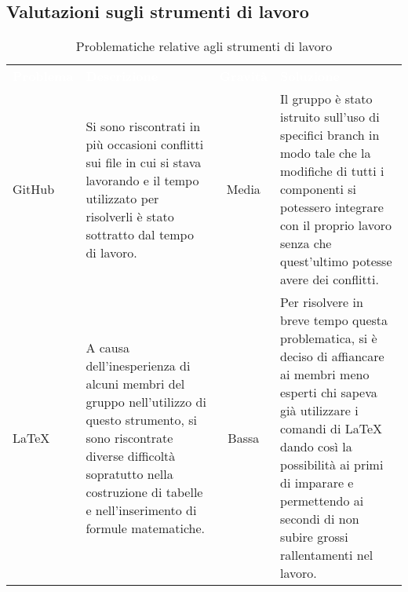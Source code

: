 \subsection{Valutazioni sugli strumenti di lavoro}

\begin{table}[H]
\caption{Problematiche relative agli strumenti di lavoro}
\begin{tabular}{ C{2.5cm} L{5cm} c L{5.5cm} }
\textcolor{white}{\textbf{Problema}} & \centerline{\textcolor{white}{\textbf{Descrizione}}} & \textcolor{white}{\textbf{Gravità}} & \centerline{\textcolor{white}{\textbf{Soluzione}}}\\
GitHub & Si sono riscontrati in più occasioni
conflitti sui file in cui si stava lavorando e il tempo utilizzato per risolverli è stato sottratto dal tempo di lavoro. & Media & Il gruppo è stato istruito sull’uso di specifici branch in modo tale che la modifiche di tutti i componenti si potessero integrare con il proprio lavoro senza che quest’ultimo potesse avere dei conflitti. \\
\LaTeX{} & A causa dell’inesperienza di
alcuni membri del gruppo nell’utilizzo
di questo strumento, si sono riscontrate diverse
difficoltà sopratutto nella costruzione di tabelle e nell'inserimento di formule matematiche. & Bassa & Per risolvere in breve tempo questa problematica, si è deciso di affiancare ai membri meno esperti chi sapeva già utilizzare i comandi di \LaTeX{} dando così la possibilità ai primi di imparare e permettendo ai secondi di non subire grossi rallentamenti nel lavoro.
\end{tabular}
\end{table}